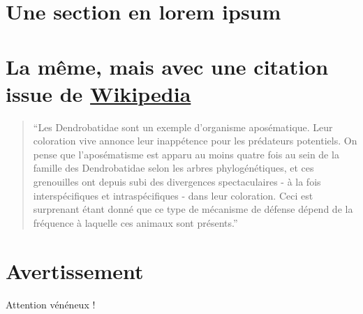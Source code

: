 \documentclass[a4paper, 12pt, french]{article}
\begin{document}
\section*{Une section en lorem ipsum}

\lipsum[1-7]

\section*{La même, mais avec une citation issue de \href{https://fr.wikipedia.org/wiki/Dendrobatidae}{Wikipedia}}

\lipsum[1-4]

\begin{quotation}
    \enquote{Les Dendrobatidae sont un exemple d'organisme aposématique. Leur coloration vive annonce leur inappétence pour les prédateurs potentiels. On pense que l'aposématisme est apparu au moins quatre fois au sein de la famille des Dendrobatidae selon les arbres phylogénétiques, et ces grenouilles ont depuis subi des divergences spectaculaires - à la fois interspécifiques et intraspécifiques - dans leur coloration. Ceci est surprenant étant donné que ce type de mécanisme de défense dépend de la fréquence à laquelle ces animaux sont présents.}
\end{quotation}

\lipsum[5-7]

\section*{Avertissement}

\begin{tcolorbox}[colback=blue!80!black,
                  colframe=yellow,
                  coltext=white,
                  center,
                  width=0.6\textwidth]
\centering Attention vénéneux !
\end{tcolorbox}

\listoffigures
\tableofcontents
\end{document}

